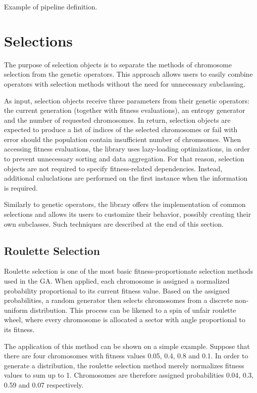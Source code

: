 \begin{listing}[ht]
	\caption{Example of pipeline definition.}
	\todo %
	\label{listing:pipeline-definition}
\end{listing}

\section{Selections}\label{section:selection}
The purpose of selection objects is to separate the methods of chromosome selection from the genetic operators. This approach allows users to easily combine operators with selection methods without the need for unnecessary subclassing.

As input, selection objects receive three parameters from their genetic operators: the current generation (together with fitness evaluations), an entropy generator and the number of requested chromosomes. In return, selection objects are expected to produce a list of indices of the selected chromosomes or fail with error should the population contain insufficient number of chromsomes. When accessing fitness evaluations, the library uses lazy-loading optimizations, in order to prevent unnecessary sorting and data aggregation. For that reason, selection objects are not required to specify fitness-related dependencies. Instead, additional caluclations are performed on the first instance when the information is required.

Similarly to genetic operators, the library offers the implementation of common selections and allows its users to customize their behavior, possibly creating their own subclasses. Such techniques are described at the end of this section.

\subsection{Roulette Selection}
Roulette selection is one of the most basic fitness-proportionate selection methods used in the GA. When applied, each chromosome is assigned a normalized probability proportional to its current fitness value. Based on the assigned probabilities, a random generator then selects chromosomes from a discrete non-uniform distribution. This process can be likened to a spin of unfair roulette wheel, where every chromosome is allocated a sector with angle proportional to its fitness. \cite{GaConceptsDesigns}

The application of this method can be shown on a simple example. Suppose that there are four chromosomes with fitness values 0.05, 0.4, 0.8 and 0.1. In order to generate a distribution, the roulette selection method merely normalizes fitness values to sum up to 1. Chromosomes are therefore assigned probabilities 0.04, 0.3, 0.59 and 0.07 respectively.


